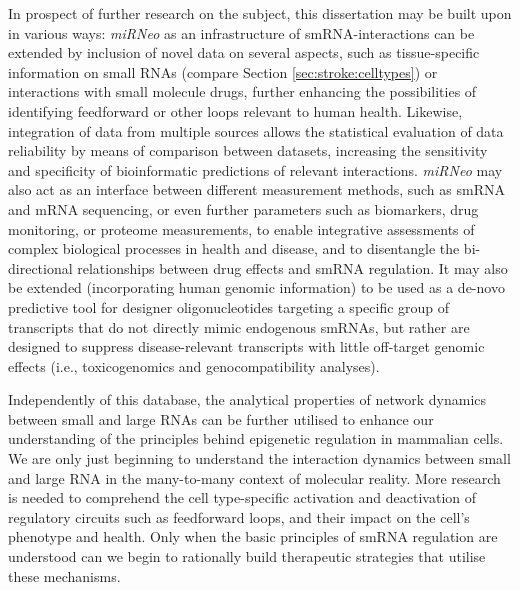 In prospect of further research on the subject, this dissertation may be built upon in various ways: \emph{miRNeo} as an infrastructure of smRNA-interactions can be extended by inclusion of novel data on several aspects, such as tissue-specific information on small RNAs (compare Section \ref{sec:stroke:celltypes}) or interactions with small molecule drugs, further enhancing the possibilities of identifying feedforward or other loops relevant to human health. Likewise, integration of data from multiple sources allows the statistical evaluation of data reliability by means of comparison between datasets, increasing the sensitivity and specificity of bioinformatic predictions of relevant interactions. \emph{miRNeo} may also act as an interface between different measurement methods, such as smRNA and mRNA sequencing, or even further parameters such as biomarkers, drug monitoring, or proteome measurements, to enable integrative assessments of complex biological processes in health and disease, and to disentangle the bi-directional relationships between drug effects and smRNA regulation. It may also be extended (incorporating human genomic information) to be used as a de-novo predictive tool for designer oligonucleotides targeting a specific group of transcripts that do not directly mimic endogenous smRNAs, but rather are designed to suppress disease-relevant transcripts with little off-target genomic effects (i.e., toxicogenomics and genocompatibility analyses).

Independently of this database, the analytical properties of network dynamics between small and large RNAs can be further utilised to enhance our understanding of the principles behind epigenetic regulation in mammalian cells. We are only just beginning to understand the interaction dynamics between small and large RNA in the many-to-many context of molecular reality. More research is needed to comprehend the cell type-specific activation and deactivation of regulatory circuits such as feedforward loops, and their impact on the cell's phenotype and health. Only when the basic principles of smRNA regulation are understood can we begin to rationally build therapeutic strategies that utilise these mechanisms. 